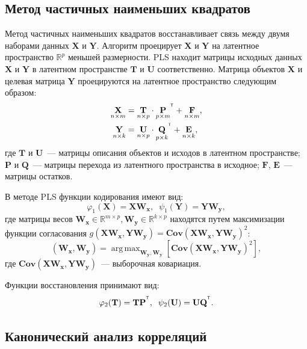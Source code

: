 \documentclass[12pt]{article}
\DeclareMathOperator*{\argmax}{arg\,max}
\newcommand{\bx}{\mathbf{x}}
\newcommand{\by}{\mathbf{y}}
\newcommand{\bY}{\mathbf{Y}}
\newcommand{\bX}{\mathbf{X}}
\newcommand{\bP}{\mathbf{P}}
\newcommand{\bT}{\mathbf{T}}
\newcommand{\bQ}{\mathbf{Q}}
\newcommand{\bU}{\mathbf{U}}
\newcommand{\bW}{\mathbf{W}}
\newcommand{\T}{^{\text{\tiny\sffamily\upshape\mdseries T}}}
\begin{document}
	
	\subsection{Метод частичных наименьших квадратов}
	
	Метод частичных наименьших квадратов восстанавливает связь между двумя наборами данных $\bX$ и $\bY$. Алгоритм проецирует $\bX$ и $\bY$ на латентное пространство $\mathbb{R}^{p}$ меньшей размерности. PLS находит матрицы исходных данных $\bX$ и $\bY$ в латентном пространстве $\textbf{T}$ и $\textbf{U}$ соответственно. Матрица объектов $\bX$ и целевая матрица $\bY$ проецируются на латентное пространство следующим образом:
	\begin{align}
		\underset{n \times m}{\bX}  &= \underset{n \times p}{\textbf{T}} \cdot \underset{p \times m}{\textbf{P}}^{\T} +  \underset{n \times m}{\textbf{F}},
		\label{eq:PLSpr1} \\
		\underset{n \times k}{\bY}  &= \underset{n \times p}{\textbf{U}} \cdot \underset{p \times k}{\bQ}^{\T} + \underset{n \times k}{\textbf{E}},
		\label{eq:PLSpr2}
	\end{align}
	\noindent где $\textbf{T}$ и $\textbf{U}$~--- матрицы описания объектов и исходов в латентном пространстве; $\textbf{P}$ и $\textbf{Q}$~--- матрицы перехода из латентного пространства в исходное; $\textbf{F}$, $\textbf{E}$~--- матрицы остатков.
	
	В методе PLS  функции кодирования имеют вид:
	\begin{equation}
		\varphi_1(\bX) = \bX \bW_{\bx}, \;\;
		\psi_1(\bY) = \bY \bW_{\by},
	\end{equation} 
	где матрицы весов $\bW_{\bx} \in \mathbb{R}^{m \times p}, \bW_{\by} \in \mathbb{R}^{k \times p}$ находятся путем максимизации функции согласования $g(\bX \bW_{\bx},  \bY \bW_{\by}) = \textbf{Cov} (\bX \bW_{\bx},  \bY \bW_{\by})^{2}$:
	\begin{equation}
		(\bW_{\bx}, \bW_{\by}) = \argmax_{\bW_{\by}, \bW_{\by}}[ \textbf{Cov}(\bX \bW_{\bx}, \bY \bW_{\by})^{2}],
		\label{eq:PLSpr3}
	\end{equation}
	где $\textbf{Cov}(\bX \bW_{\bx}, \bY \bW_{\by})$~--- выборочная ковариация.
	
	\noindent Функции восстановления принимают вид:
	\begin{equation}
		\varphi_2(\bT) = \bT\bP^{\T}, \;\;
		\psi_2(\bU) = \bU \bQ^{\T}.
	\end{equation} 
	
	\subsection{Канонический анализ корреляций}
	
\end{document}
